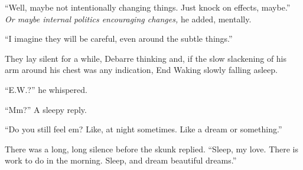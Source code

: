``Well, maybe not intentionally changing things. Just knock on effects, maybe.'' \emph{Or maybe internal politics encouraging changes,} he added, mentally.

``I imagine they will be careful, even around the subtle things.''

They lay silent for a while, Debarre thinking and, if the slow slackening of his arm around his chest was any indication, End Waking slowly falling asleep.

``E.W.?'' he whispered.

``Mm?'' A sleepy reply.

``Do you still feel em? Like, at night sometimes. Like a dream or something.''

There was a long, long silence before the skunk replied. ``Sleep, my love. There is work to do in the morning. Sleep, and dream beautiful dreams.''
